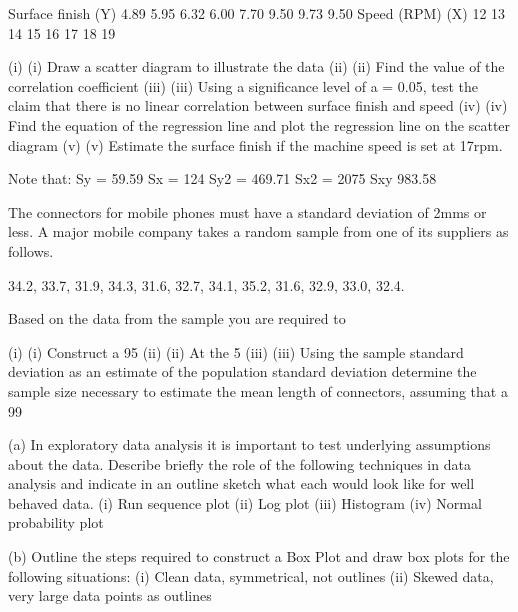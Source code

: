 Surface finish (Y)	4.89	5.95	6.32	6.00	7.70	9.50	9.73	9.50
Speed (RPM) (X)	12	13	14	15	16	17	18	19
 
(i)	(i)                  Draw a scatter diagram to illustrate the data
(ii)	(ii)                Find the value of the correlation coefficient
(iii)	(iii)               Using a significance level of a = 0.05, test the claim that there is no linear correlation between surface finish and speed
(iv)	(iv)              Find the equation of the regression line and plot the regression line on the scatter diagram
(v)	(v)                Estimate the surface finish if the machine speed is set at 17rpm. 
 
 
Note that:
Sy = 	59.59
Sx = 	124
Sy2 = 	469.71
Sx2 = 	2075
Sxy	983.58

 
The connectors for mobile phones must have a standard deviation of 2mms or less.  A major mobile company takes a random sample from one of its suppliers as follows.
 
34.2, 33.7, 31.9, 34.3, 31.6, 32.7, 34.1, 35.2, 31.6, 32.9, 33.0, 32.4.
 
Based on the data from the sample you are required to 
 
(i)	(i)                  Construct a 95%
(ii)	(ii)                At the 5%
(iii)	(iii)               Using the sample standard deviation as an estimate of the population standard deviation determine the sample size necessary to estimate the mean length of connectors, assuming that a 99%



(a)	In exploratory data analysis it is important to test underlying assumptions about the data.  Describe briefly the role of the following techniques in data analysis and indicate in an outline sketch what each would look like for well behaved data.
(i)	Run sequence plot
(ii)	Log plot
(iii)	Histogram
(iv)	Normal probability plot


(b)	Outline the steps required to construct a Box Plot and draw box plots for the following situations:
(i)	Clean data, symmetrical, not outlines
(ii)	Skewed data, very large data points as outlines

